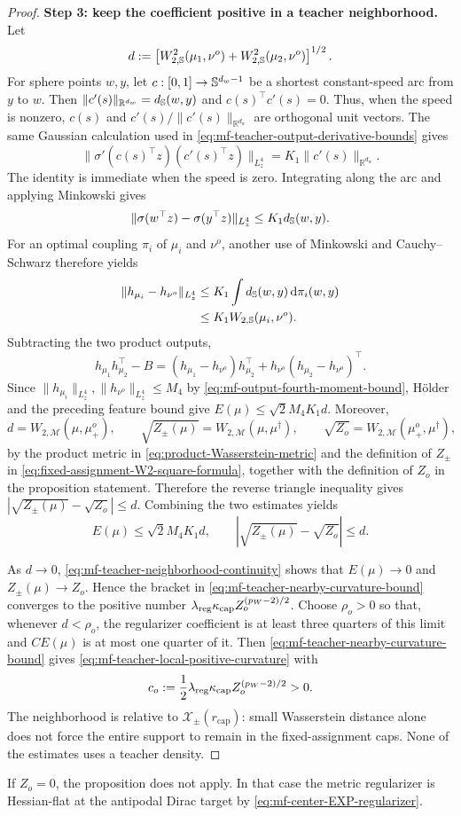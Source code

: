 \begin{proof}
\par\noindent\textbf{Step 3: keep the coefficient positive in a teacher neighborhood.}
Let
\[
 d:=\left[
 W_{2,\mathbb{S}}^2(\mu_1,\nu^o)+
 W_{2,\mathbb{S}}^2(\mu_2,\nu^o)
 \right]^{1/2}.
\]
For sphere points \(w,y\), let \(c:[0,1]\to\mathbb{S}^{d_w-1}\) be a shortest
constant-speed arc from \(y\) to \(w\). Then
\(\|c'(s)\|_{\mathbb R^{d_w}}=d_{\mathbb{S}}(w,y)\) and
\(c(s)^\top c'(s)=0\). Thus, when the speed is nonzero,
\(c(s)\) and \(c'(s)/\|c'(s)\|_{\mathbb R^{d_w}}\) are orthogonal unit
vectors. The same Gaussian calculation used in
\cref{eq:mf-teacher-output-derivative-bounds} gives
\[
 \|\sigma'(c(s)^\top z)(c'(s)^\top z)\|_{L^4_z}
 =K_1\|c'(s)\|_{\mathbb R^{d_w}}.
\]
The identity is immediate when the speed is zero. Integrating along the arc
and applying Minkowski gives
\[
 \|\sigma(w^\top z)-\sigma(y^\top z)\|_{L^4_z}
 \le K_1d_{\mathbb{S}}(w,y).
\]
For an optimal coupling \(\pi_i\) of \(\mu_i\) and \(\nu^o\), another use
of Minkowski and Cauchy--Schwarz therefore yields
\[
\begin{aligned}
 \|h_{\mu_i}-h_{\nu^o}\|_{L^4_z}
 &\le K_1\int d_{\mathbb{S}}(w,y)\,\dd\pi_i(w,y)\\
 &\le K_1W_{2,\mathbb{S}}(\mu_i,\nu^o).
\end{aligned}
\]
Subtracting the two product outputs,
\[
 h_{\mu_1}h_{\mu_2}^\top-B
 =(h_{\mu_1}-h_{\nu^o})h_{\mu_2}^\top
 +h_{\nu^o}(h_{\mu_2}-h_{\nu^o})^\top.
\]
Since \(\|h_{\mu_i}\|_{L^4_z},\|h_{\nu^o}\|_{L^4_z}\le M_4\) by
\cref{eq:mf-output-fourth-moment-bound}, H\"older and the preceding feature
bound give \(E(\mu)\le\sqrt2M_4K_1d\). Moreover,
\[
 d=W_{2,\mathcal M}(\mu,\mu_+^o),\qquad
 \sqrt{Z_\pm(\mu)}=W_{2,\mathcal M}(\mu,\mu^\dagger),\qquad
 \sqrt{Z_o}=W_{2,\mathcal M}(\mu_+^o,\mu^\dagger),
\]
by the product metric in \cref{eq:product-Wasserstein-metric} and the
definition of $Z_\pm$ in \cref{eq:fixed-assignment-W2-square-formula},
together with the definition of $Z_o$ in the proposition statement.
Therefore the reverse triangle inequality gives
\(\left|\sqrt{Z_\pm(\mu)}-\sqrt{Z_o}\right|\le d\). Combining the two
estimates yields
\begin{equation}
\label{eq:mf-teacher-neighborhood-continuity}
 E(\mu)\le\sqrt2M_4K_1d,
 \qquad
 \left|\sqrt{Z_\pm(\mu)}-\sqrt{Z_o}\right|\le d.
\end{equation}

As \(d\to0\), \cref{eq:mf-teacher-neighborhood-continuity} shows that
\(E(\mu)\to0\) and \(Z_\pm(\mu)\to Z_o\). Hence the bracket in
\cref{eq:mf-teacher-nearby-curvature-bound} converges to the positive number
\(\lambda_{\mathrm{reg}}\kappa_{\mathrm{cap}}Z_o^{(p_W-2)/2}\). Choose
\(\rho_o>0\) so that, whenever \(d<\rho_o\), the regularizer coefficient is
at least three quarters of this limit and \(CE(\mu)\) is at most one quarter
of it. Then \cref{eq:mf-teacher-nearby-curvature-bound} gives
\cref{eq:mf-teacher-local-positive-curvature} with
\[
 c_o:=\frac12\lambda_{\mathrm{reg}}\kappa_{\mathrm{cap}}Z_o^{(p_W-2)/2}>0.
\]
The neighborhood is relative to \(\mathcal X_\pm(r_{\mathrm{cap}})\): small
Wasserstein distance alone does not force the entire support to remain in the
fixed-assignment caps. None of the estimates uses a teacher density.
\end{proof}

If \(Z_o=0\), the proposition does not apply. In that case the metric
regularizer is Hessian-flat at the antipodal Dirac target by
\cref{eq:mf-center-EXP-regularizer}.
